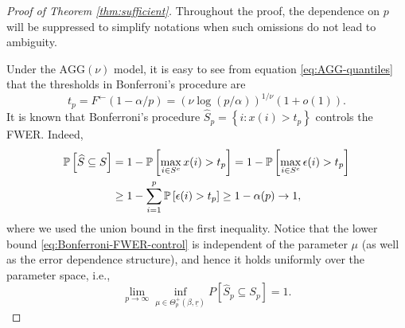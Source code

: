 \begin{proof}[Proof of Theorem \ref{thm:sufficient}]
Throughout the proof, the dependence on $p$ will be suppressed to simplify notations when such omissions do not lead to ambiguity.

Under the $\text{AGG}(\nu)$ model, it is easy to see from equation \eqref{eq:AGG-quantiles} that the thresholds in Bonferroni's procedure are 
\begin{equation}\label{e:AGG-threshold}
t_p = F^{\leftarrow}(1 - \alpha/p) = (\nu\log{(p/\alpha)})^{1/\nu}(1+o(1)).
\end{equation}
It is known that Bonferroni's procedure $\widehat{S}_p = \left\{i:x(i)>t_p\right\}$ controls the FWER.  Indeed,
\begin{align} \label{eq:Bonferroni-FWER-control}
    \P\left[\widehat{S} \subseteq S\right] 
        &= 1 - \P\left[\max_{i\in S^c}x(i) > t_p\right] = 1 - \P\left[\max_{i\in S^c}\epsilon(i) > t_p\right]\nonumber \\
        &\ge 1 - \sum_{i=1}^{p}\P\left[\epsilon(i)>t_p\right] \ge 1 - \alpha(p) \to 1,
\end{align}
where we used the union bound in the first inequality. 
Notice that the lower bound \eqref{eq:Bonferroni-FWER-control} is independent of the parameter $\mu$ (as well as 
the error dependence structure), and hence it holds uniformly over the parameter space, i.e.,
\begin{equation} \label{eq:exact-supporot-recovery-FWER}
    \lim_{p\to\infty}\inf_{\mu\in\Theta_p^+(\beta, \underline{r})} P[\widehat{S}_p \subseteq S_p] = 1.
\end{equation}



\end{proof}
